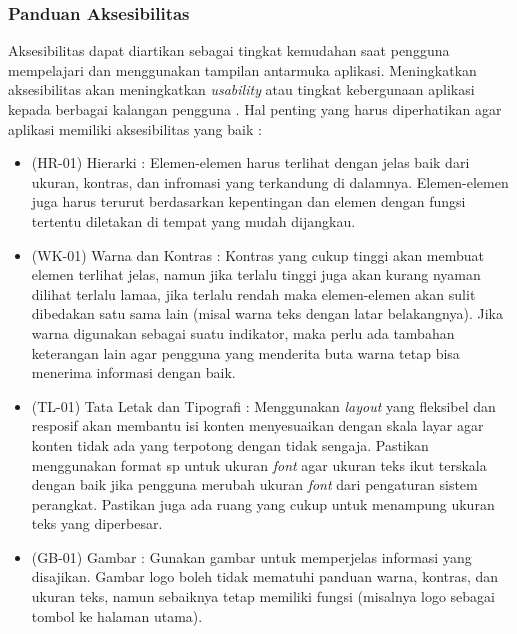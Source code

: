 \subsubsection{Panduan Aksesibilitas}
Aksesibilitas dapat diartikan sebagai tingkat kemudahan saat pengguna mempelajari dan menggunakan tampilan antarmuka aplikasi. Meningkatkan aksesibilitas akan meningkatkan \textit{usability} atau tingkat kebergunaan aplikasi kepada berbagai kalangan pengguna \cite{materialdesign}. Hal penting yang harus diperhatikan agar aplikasi memiliki aksesibilitas yang baik :
\begin{itemize}
    \item (HR-01) Hierarki : Elemen-elemen harus terlihat dengan jelas baik dari ukuran, kontras, dan infromasi yang terkandung di dalamnya. Elemen-elemen juga harus terurut berdasarkan kepentingan dan elemen dengan fungsi tertentu diletakan di tempat yang mudah dijangkau.
    \item (WK-01) Warna dan Kontras : Kontras yang cukup tinggi akan membuat elemen terlihat jelas, namun jika terlalu tinggi juga akan kurang nyaman dilihat terlalu lamaa, jika terlalu rendah maka elemen-elemen akan sulit dibedakan satu sama lain (misal warna teks dengan latar belakangnya). Jika warna digunakan sebagai suatu indikator, maka perlu ada tambahan keterangan lain agar pengguna yang menderita buta warna tetap bisa menerima informasi dengan baik.
    \item (TL-01) Tata Letak dan Tipografi : Menggunakan \textit{layout} yang fleksibel dan resposif akan membantu isi konten menyesuaikan dengan skala layar agar konten tidak ada yang terpotong dengan tidak sengaja. Pastikan menggunakan format sp untuk ukuran \textit{font} agar ukuran teks ikut terskala dengan baik jika pengguna merubah ukuran \textit{font} dari pengaturan sistem perangkat. Pastikan juga ada ruang yang cukup untuk menampung ukuran teks yang diperbesar.
    \item (GB-01) Gambar : Gunakan gambar untuk memperjelas informasi yang disajikan. Gambar logo boleh tidak mematuhi panduan warna, kontras, dan ukuran teks, namun sebaiknya tetap memiliki fungsi (misalnya logo sebagai tombol ke halaman utama).  
\end{itemize}

